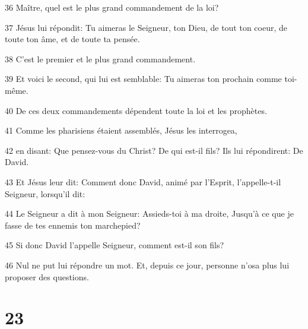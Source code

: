 \par 36 Maître, quel est le plus grand commandement de la loi?
\par 37 Jésus lui répondit: Tu aimeras le Seigneur, ton Dieu, de tout ton coeur, de toute ton âme, et de toute ta pensée.
\par 38 C'est le premier et le plus grand commandement.
\par 39 Et voici le second, qui lui est semblable: Tu aimeras ton prochain comme toi-même.
\par 40 De ces deux commandements dépendent toute la loi et les prophètes.
\par 41 Comme les pharisiens étaient assemblés, Jésus les interrogea,
\par 42 en disant: Que pensez-vous du Christ? De qui est-il fils? Ils lui répondirent: De David.
\par 43 Et Jésus leur dit: Comment donc David, animé par l'Esprit, l'appelle-t-il Seigneur, lorsqu'il dit:
\par 44 Le Seigneur a dit à mon Seigneur: Assieds-toi à ma droite, Jusqu'à ce que je fasse de tes ennemis ton marchepied?
\par 45 Si donc David l'appelle Seigneur, comment est-il son fils?
\par 46 Nul ne put lui répondre un mot. Et, depuis ce jour, personne n'osa plus lui proposer des questions.

\chapter{23}

